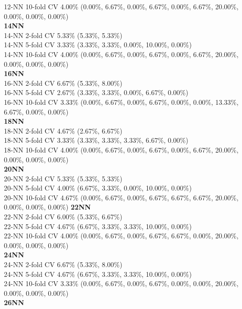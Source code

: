 \documentclass[11pt,a4paper]{article}
\begin{document}
12-NN 10-fold CV   4.00\%   (0.00\%, 6.67\%, 0.00\%, 6.67\%, 0.00\%, 6.67\%, 20.00\%, 0.00\%, 0.00\%, 0.00\%)\\  
\textbf{14NN }\\
14-NN 2-fold CV   5.33\%   (5.33\%, 5.33\%)\\  
14-NN 5-fold CV   3.33\%   (3.33\%, 3.33\%, 0.00\%, 10.00\%, 0.00\%)\\  
14-NN 10-fold CV   4.00\%   (0.00\%, 6.67\%, 0.00\%, 6.67\%, 0.00\%, 6.67\%, 20.00\%, 0.00\%, 0.00\%, 0.00\%)\\  
\textbf{16NN }\\
16-NN 2-fold CV   6.67\%   (5.33\%, 8.00\%)\\  
16-NN 5-fold CV   2.67\%   (3.33\%, 3.33\%, 0.00\%, 6.67\%, 0.00\%)\\  
16-NN 10-fold CV   3.33\%   (0.00\%, 6.67\%, 0.00\%, 6.67\%, 0.00\%, 0.00\%, 13.33\%, 6.67\%, 0.00\%, 0.00\%)\\  
\textbf{18NN }\\
18-NN 2-fold CV   4.67\%   (2.67\%, 6.67\%)\\  
18-NN 5-fold CV   3.33\%   (3.33\%, 3.33\%, 3.33\%, 6.67\%, 0.00\%)\\  
18-NN 10-fold CV   4.00\%   (0.00\%, 6.67\%, 0.00\%, 6.67\%, 0.00\%, 6.67\%, 20.00\%, 0.00\%, 0.00\%, 0.00\%)\\  
\textbf{20NN }\\
20-NN 2-fold CV   5.33\%   (5.33\%, 5.33\%)\\  
20-NN 5-fold CV   4.00\%   (6.67\%, 3.33\%, 0.00\%, 10.00\%, 0.00\%)\\  
20-NN 10-fold CV   4.67\%   (0.00\%, 6.67\%, 0.00\%, 6.67\%, 6.67\%, 6.67\%, 20.00\%, 0.00\%, 0.00\%, 0.00\%)  
\textbf{22NN }\\
22-NN 2-fold CV   6.00\%   (5.33\%, 6.67\%)\\  
22-NN 5-fold CV   4.67\%   (6.67\%, 3.33\%, 3.33\%, 10.00\%, 0.00\%)\\  
22-NN 10-fold CV   4.00\%   (0.00\%, 6.67\%, 0.00\%, 6.67\%, 6.67\%, 0.00\%, 20.00\%, 0.00\%, 0.00\%, 0.00\%)\\  
\textbf{24NN }\\
24-NN 2-fold CV   6.67\%   (5.33\%, 8.00\%)\\  
24-NN 5-fold CV   4.67\%   (6.67\%, 3.33\%, 3.33\%, 10.00\%, 0.00\%)\\  
24-NN 10-fold CV   3.33\%   (0.00\%, 6.67\%, 0.00\%, 6.67\%, 0.00\%, 0.00\%, 20.00\%, 0.00\%, 0.00\%, 0.00\%)\\  
\textbf{26NN }\\
\end{document}
